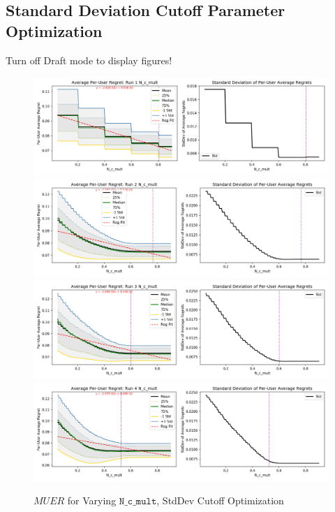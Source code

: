 	\fi




\subsection{Standard Deviation Cutoff Parameter Optimization}
	\label{Standard Deviation Cutoff Parameter Optimization}

	\ifdraft
	Turn off Draft mode to display figures!
	\else

	\begin{figure}[H]
	\includegraphics[width=1.1\textwidth,center]{figures/opt_param/opt_param_std_11100_N_c_mult1.png}%
	\newline
	\includegraphics[width=1.1\textwidth,center]{figures/opt_param/opt_param_std_11100_N_c_mult2.png}%
	\newline
	\includegraphics[width=1.1\textwidth,center]{figures/opt_param/opt_param_std_11100_N_c_mult3.png}%
	\newline
	\includegraphics[width=1.1\textwidth,center]{figures/opt_param/opt_param_std_11100_N_c_mult4.png}%
	\caption{$MUER$ for Varying $\mathtt{N\_c\_mult}$, StdDev Cutoff Optimization}
	\end{figure}

